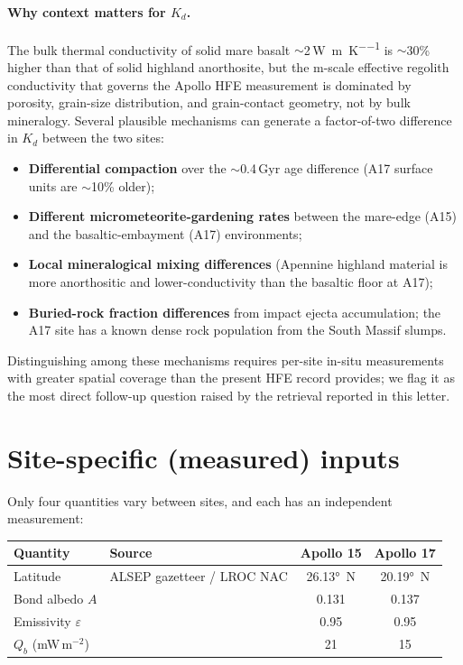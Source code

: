 \documentclass[11pt]{report}
\begin{document}
\paragraph{Why context matters for $K_d$.}
The bulk thermal conductivity of solid mare basalt
$\sim$2\,\si{\watt\per\meter\per\kelvin} is $\sim$30\% higher than
that of solid highland anorthosite, but the m-scale effective
regolith conductivity that governs the Apollo HFE measurement is
dominated by porosity, grain-size distribution, and grain-contact
geometry, not by bulk mineralogy. Several plausible mechanisms can
generate a factor-of-two difference in $K_d$ between the two sites:
\begin{itemize}\itemsep1pt
  \item \textbf{Differential compaction} over the $\sim$0.4\,Gyr
        age difference (A17 surface units are $\sim$10\% older);
  \item \textbf{Different micrometeorite-gardening rates} between
        the mare-edge (A15) and the basaltic-embayment (A17)
        environments;
  \item \textbf{Local mineralogical mixing differences} (Apennine
        highland material is more anorthositic and lower-conductivity
        than the basaltic floor at A17);
  \item \textbf{Buried-rock fraction differences} from impact ejecta
        accumulation; the A17 site has a known dense rock population
        from the South Massif slumps.
\end{itemize}
Distinguishing among these mechanisms requires per-site
in-situ measurements with greater spatial coverage than the present
HFE record provides; we flag it as the most direct follow-up
question raised by the retrieval reported in this letter.

\section{Site-specific (measured) inputs}
Only four quantities vary between sites, and each has an independent
measurement:
\begin{center}\small\begin{tabular}{llcc}
\toprule
Quantity & Source & Apollo 15 & Apollo 17 \\
\midrule
Latitude          & ALSEP gazetteer / LROC NAC & \ang{26.13}~N & \ang{20.19}~N \\
Bond albedo $A$   & \citet{vasavada2012}       & 0.131         & 0.137 \\
Emissivity $\varepsilon$ & \citet{bandfield2015} & 0.95         & 0.95 \\
$Q_b$ (mW\,m$^{-2}$) & \citet{langseth1976,nagihara2018} & 21 & 15 \\
\bottomrule
\end{tabular}\end{center}
\end{document}

